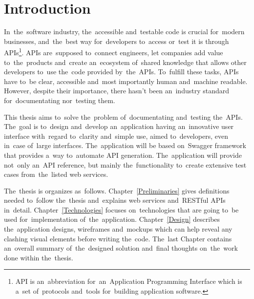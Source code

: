 


\chapter{Introduction}
In~the~software industry, the~accessible and~testable code is crucial for~modern
businesses, and~the~best way for~developers to~access or~test it is
through APIs\footnote{API is an~abbreviation for~an~Application Programming Interface which is a~set
of~protocols and~tools for~building application software.}. APIs are~supposed
to~connect engineers, let companies add value to~the~products and~create
an~ecosystem of~shared knowledge that allows other developers to~use the~code
provided by~the~APIs. To~fulfill these tasks, APIs have to~be clear, accessible
and~most importantly human and~machine readable. However, despite their
importance, there hasn't been an~industry standard for~documentating nor~testing
them.

This thesis aims to~solve the~problem of~documentating and~testing the~APIs.
The~goal is to~design and~develop an~application having an~innovative user
interface with~regard to~clarity and~simple use, aimed to~developers, even
in~case of~large interfaces. The~application will be based on~Swagger framework
that provides a~way to~automate API generation. The~application will provide
not~only an~API reference, but mainly the~functionality to~create extensive test
cases from~the~listed web services.


The~thesis is organizes as~follows. Chapter~\ref{Preliminaries} gives
definitions needed to~follow the~thesis and~explains web services and~RESTful
APIs in~detail. Chapter~\ref{Technologies} focuses on~technologies that are
going to~be used for~implementation of~the~application. Chapter~\ref{Design}
describes the~application designs, wireframes and~mockups which can help reveal
any clashing visual elements before writing the~code. The~last Chapter contains
an~overall summary of~the~designed solution and~final thoughts on~the~work done
within the~thesis.



